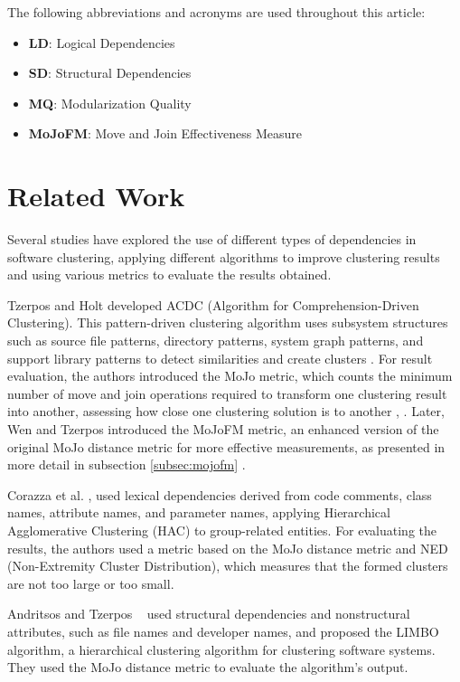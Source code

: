 \documentclass{ieeeaccess}
\begin{document}
The following abbreviations and acronyms are used throughout this article:

\begin{itemize}
    \item \textbf{LD}: Logical Dependencies
    \item \textbf{SD}: Structural Dependencies
    \item \textbf{MQ}: Modularization Quality
    \item \textbf{MoJoFM}: Move and Join Effectiveness Measure
\end{itemize}

\section{Related Work}
\label{sec:related_work}

Several studies have explored the use of different types of dependencies in software clustering, applying different algorithms to improve clustering results and using various metrics to evaluate the results obtained.

Tzerpos and Holt developed ACDC (Algorithm for Comprehension-Driven Clustering). This pattern-driven clustering algorithm uses subsystem structures such as source file patterns, directory patterns, system graph patterns, and support library patterns to detect similarities and create clusters \cite{acdc}. For result evaluation, the authors introduced the MoJo metric, which counts the minimum number of move and join operations required to transform one clustering result into another, assessing how close one clustering solution is to another \cite{b3}, \cite{tzerpos1}. Later, Wen and Tzerpos introduced the MoJoFM metric, an enhanced version of the original MoJo distance metric for more effective measurements, as presented in more detail in subsection \ref{subsec:mojofm} \cite{mojofm}.

Corazza et al. \cite{b13}, \cite{corazza2} used lexical dependencies derived from code comments, class names, attribute names, and parameter names, applying Hierarchical Agglomerative Clustering (HAC) to group-related entities. For evaluating the results, the authors used a metric based on the MoJo distance metric and NED (Non-Extremity Cluster Distribution), which measures that the formed clusters are not too large or too small.

Andritsos and Tzerpos ~\cite{tzerpos1} used structural dependencies and nonstructural attributes, such as file names and developer names, and proposed the LIMBO algorithm, a hierarchical clustering algorithm for clustering software systems. They used the MoJo distance metric to evaluate the algorithm's output.
\end{document}

